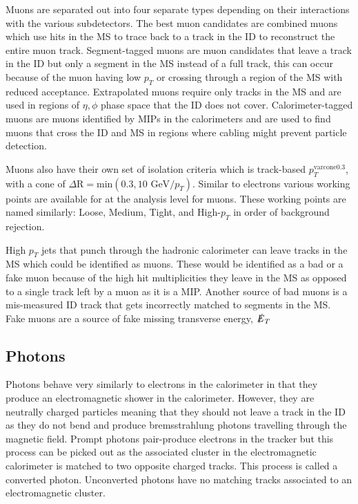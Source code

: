 Muons are separated out into four separate types depending on their interactions with the various subdetectors.  The best muon candidates are combined muons which use hits in the MS to trace back to a track in the ID to reconstruct the entire muon track.  Segment-tagged muons are muon candidates that leave a track in the ID but only a segment in the MS instead of a full track, this can occur because of the muon having low $p_T$ or crossing through a region of the MS with reduced acceptance.  Extrapolated muons require only tracks in the MS and are used in regions of $\eta, \phi$ phase space that the ID does not cover.  Calorimeter-tagged muons are muons identified by MIPs in the calorimeters and are used to find muons that cross the ID and MS in regions where cabling might prevent particle detection.

Muons also have their own set of isolation criteria which is track-based $p_{T}^{\text{varcone0.3}}$, with a cone of $\Delta \text{R} = \text{min}(0.3,10\text{ GeV}/p_T)$.  Similar to electrons various working points are available for at the analysis level for muons.  These working points are named similarly: Loose, Medium, Tight, and High-$p_T$ in order of background rejection.  

High $p_T$ jets that punch through the hadronic calorimeter can leave tracks in the MS which could be identified as muons.  These would be identified as a bad or a fake muon because of the high hit multiplicities they leave in the MS as opposed to a single track left by a muon as it is a MIP.  Another source of bad muons is a mis-measured ID track that gets incorrectly matched to segments in the MS.  Fake muons are a source of fake missing transverse energy, $ \slashed{E}_T$

\subsection{Photons}
Photons behave very similarly to electrons in the calorimeter in that they produce an electromagnetic shower in the calorimeter.  However, they are neutrally charged particles meaning that they should not leave a track in the ID as they do not bend and produce bremsstrahlung photons travelling through the magnetic field.  Prompt photons pair-produce electrons in the tracker but this process can be picked out as the associated cluster in the electromagnetic calorimeter is matched to two opposite charged tracks.  This process is called a converted photon.  Unconverted photons have no matching tracks associated to an electromagnetic cluster.    

